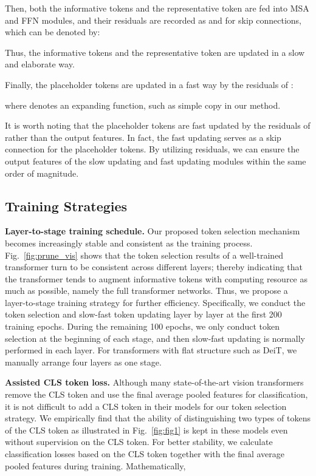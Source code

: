 \documentclass[letterpaper]{article} \usepackage{aaai22}  \usepackage{times}  \usepackage{helvet}  \usepackage{courier}  \usepackage[hyphens]{url}  \usepackage{graphicx} \urlstyle{rm} \def\UrlFont{\rm}  \usepackage{natbib}  \usepackage{caption} \DeclareCaptionStyle{ruled}{labelfont=normalfont,labelsep=colon,strut=off} \frenchspacing  \setlength{\pdfpagewidth}{8.5in}  \setlength{\pdfpageheight}{11in}  \usepackage{algorithm}
\begin{document}
Then, both the informative tokens  and the representative token  are fed into MSA and FFN modules, and their residuals are recorded as  and  for skip connections, which can be denoted by:

Thus, the informative tokens  and the representative token  are updated in a slow and elaborate way.

Finally, the placeholder tokens  are updated in a fast way by the residuals of :

where  denotes an expanding function, such as simple copy in our method. 

It is worth noting that the placeholder tokens are fast updated by the residuals of  rather than the output features. In fact, the fast updating serves as a skip connection for the placeholder tokens.
By utilizing residuals, we can ensure the output features of the slow updating and fast updating modules within the same order of magnitude. 



\subsection{Training Strategies}




\noindent\textbf{Layer-to-stage training schedule.} 
Our proposed token selection mechanism becomes increasingly stable and consistent as the training process. Fig.~\ref{fig:prune_vis} shows that the token selection results of a well-trained transformer turn to be consistent across different layers;  thereby indicating that the transformer tends to augment informative tokens with computing resource as much as possible, namely the full transformer networks.
Thus, we propose a layer-to-stage training strategy for further efficiency. Specifically, we conduct the token selection and slow-fast token updating layer by layer at the first 200 training epochs. During the remaining 100 epochs, we only conduct token selection at the beginning of each stage, and then slow-fast updating is normally performed in each layer. For transformers with flat structure such as DeiT, we manually arrange four layers as one stage. 



\noindent\textbf{Assisted CLS token loss.}
Although many state-of-the-art vision transformers~\cite{PVT,LeViT} remove the CLS token and use the final average pooled features for classification, it is not difficult to add a CLS token in their models for our token selection strategy. We empirically find that the ability of distinguishing two types of tokens of the CLS token as illustrated in Fig.~\ref{fig:fig1} is kept in these models even without supervision on the CLS token. For better stability, we calculate classification losses based on the CLS token together with the final average pooled features during training. Mathematically, 
\end{document}
